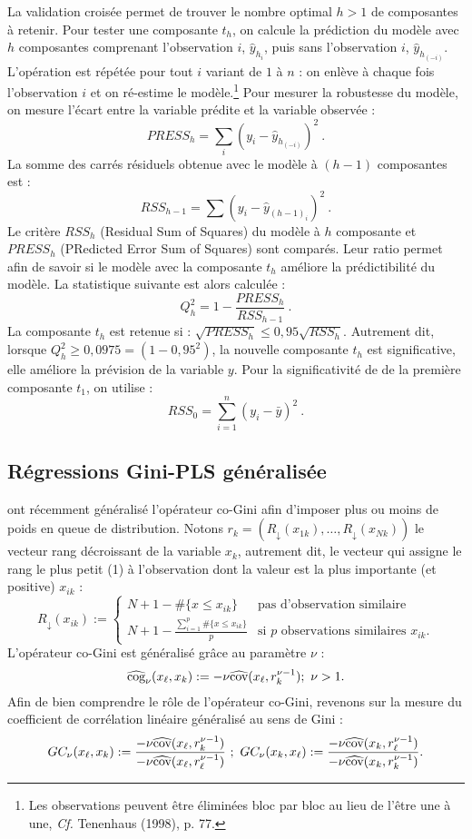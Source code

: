 La validation croisée permet de trouver le nombre optimal $h>1$ de composantes à retenir. Pour tester une composante $t_h$, on calcule la prédiction du modèle avec $h$ composantes comprenant l'observation $i$, $\hat{y}_{h_i}$, puis sans l'observation $i$, $\hat{y}_{h_{(-i)}}$. L'opération est répétée pour tout $i$ variant de $1$ à $n$ : on enlève à chaque fois l'observation $i$ et on ré-estime le modèle.\footnote{Les observations peuvent être éliminées bloc par bloc au lieu de l'être une à une, \emph{Cf.} Tenenhaus (1998), p. 77.} Pour mesurer la robustesse du modèle, on mesure l'écart entre la variable prédite et la variable observée :
\[
PRESS_h =  \sum_i\left(y_i - \hat{y}_{h_{(-i)}}\right)^2 \ .
\]
La somme des carrés résiduels obtenue avec le modèle à $(h-1)$ composantes est : 
\[
RSS_{h-1} = \sum \left(y_i - \hat{y}_{(h-1)_i}\right)^2 \ .
\]
Le critère $RSS_h$ (Residual Sum of Squares) du modèle à $h$ composante et $PRESS_h$ (PRedicted Error Sum of Squares) sont comparés. Leur ratio permet afin de savoir si le modèle avec la composante $t_h$ améliore la prédictibilité du modèle. La statistique suivante est alors calculée :
\[
Q^2_h =1 - \frac{PRESS_h}{RSS_{h-1}} \ .
\]
La composante $t_h$ est retenue si : $\sqrt{PRESS_h} \leq 0,95 \sqrt{RSS_h}$. Autrement dit, lorsque $Q^2_h \geq 0,0975 = (1 - 0,95^2)$, la nouvelle composante $t_h$ est significative, elle améliore la prévision de la variable $y$. Pour la significativité de de la première composante $t_1$,  on utilise :
\[
RSS_0 = \sum^{n}_{i = 1} \left(y_i - \bar{y}\right)^2  \ .
\]


\subsection{Régressions Gini-PLS généralisée} 

\citet{Schechtman03} ont récemment généralisé l'opérateur co-Gini afin d'imposer plus ou moins de poids en queue de distribution. Notons $r_{k}=(R_\downarrow(x_{1k}),\ldots, R_\downarrow(x_{Nk}))$ le vecteur rang décroissant de la variable $x_k$, autrement dit, le vecteur qui assigne le rang le plus petit (1) à l'observation dont la valeur est la plus importante (et positive) $x_{ik}$ :
\[
R_\downarrow(x_{ik}) :=
\left\{ \begin{array}{ll}
N+1- \#\{x \leq x_{ik} \} & \text{pas d'observation similaire} \\
N+1-\frac{\sum_{i=1}^p \#\{ x \leq x_{ik}  \}}{p} & \text{si $p$ observations similaires $x_{ik}$.}
\end{array}
\right.
\]
L'opérateur co-Gini est généralisé grâce au paramètre $\nu$ :
\begin{equation}\label{cogg}
\widehat{\text{cog}}_\nu(x_\ell,x_k) := -\nu \widehat{\text{cov}}(x_\ell,r_{k}^{\nu-1}) ;  \ \nu > 1.
\end{equation}
Afin de bien comprendre le rôle de l'opérateur co-Gini, revenons sur la mesure du coefficient de corrélation linéaire généralisé au sens de Gini :
\[
GC_\nu(x_\ell,x_k) := \frac{-\nu \widehat{\text{cov}}(x_\ell,r_{k}^{\nu-1})}{-\nu \widehat{\text{cov}}(x_\ell,r_{\ell}^{\nu-1})} \ ; \ GC_\nu(x_k,x_\ell) := \frac{-\nu \widehat{\text{cov}}(x_k,r_{\ell}^{\nu-1})}{-\nu \widehat{\text{cov}}(x_k,r_{k}^{\nu-1})}.
\]

